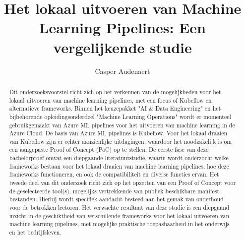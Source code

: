 \documentclass{hogent-article}
\title{Het lokaal uitvoeren van Machine Learning Pipelines: Een vergelijkende studie}
\author{Casper Audenaert}
\begin{document}
\begin{abstract}
  Dit onderzoeksvoorstel richt zich op het verkennen van de mogelijkheden voor het lokaal uitvoeren van machine learning pipelines, met een focus of Kubeflow en alternatieve frameworks.
  Binnen het keuzepakket "AI \& Data Engineering" en het bijbehorende opleidingsonderdeel "Machine Learning Operations" wordt er momenteel gebruikgemaakt van Azure ML pipelines voor het uitvoeren van machine learning in de Azure Cloud.
  De basis van Azure ML pipelines is Kubeflow. Voor het lokaal draaien van Kubeflow zijn er echter aanzienlijke uitdagingen, waardoor het noodzakelijk is om een aangepaste Proof of Concept (PoC) op te stellen.
  De eerste fase van deze bachelorproef omvat een diepgaande literatuurstudie, waarin wordt onderzocht welke frameworks bestaan voor het lokaal draaien van machine learning pipelines, hoe deze frameworks functioneren, en ook de compatibiliteit en diverse functies ervan.
  Het tweede deel van dit onderzoek richt zich op het opzetten van een Proof of Concept voor de geselecteerde tool(s), mogelijks vertrekkende van publiek beschikbare manifest bestanden. Hierbij wordt specifiek aandacht besteed aan het gemak van onderhoud voor de betrokken lectoren.
  Het verwachte resultaat van deze studie is een diepgaand inzicht in de geschiktheid van verschillende frameworks voor het lokaal uitvoeren van machine learning pipelines, met mogelijke praktische toepasbaarheid in het onderwijs en het bedrijfsleven.
\end{abstract}

\tableofcontents



\printbibliography[heading=bibintoc]
\end{document}
